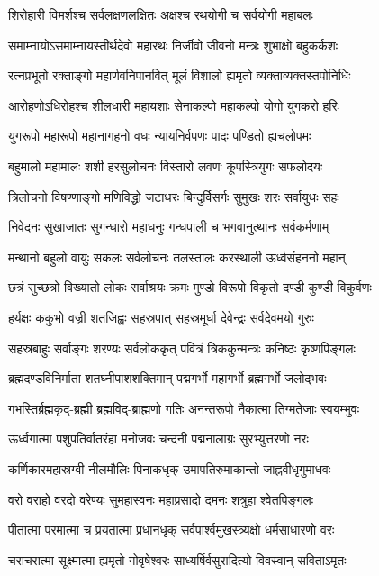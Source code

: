 \twolineshloka
{शिरोहारी विमर्शश्च सर्वलक्षणलक्षितः}%
{अक्षश्च रथयोगी च सर्वयोगी महाबलः}%

\twolineshloka
{समाम्नायोऽसमाम्नायस्तीर्थदेवो महारथः}%
{निर्जीवो जीवनो मन्त्रः शुभाक्षो बहुकर्कशः}%

\twolineshloka
{रत्नप्रभूतो रक्ताङ्गो महार्णवनिपानवित्}%
{मूलं विशालो ह्यमृतो व्यक्ताव्यक्तस्तपोनिधिः}%

\twolineshloka
{आरोहणोऽधिरोहश्च शीलधारी महायशाः}%
{सेनाकल्पो महाकल्पो योगो युगकरो हरिः}%

\twolineshloka
{युगरूपो महारूपो महानागहनो वधः}%
{न्यायनिर्वपणः पादः पण्डितो ह्यचलोपमः}%

\twolineshloka
{बहुमालो महामालः शशी हरसुलोचनः}%
{विस्तारो लवणः कूपस्त्रियुगः सफलोदयः}%

\twolineshloka
{त्रिलोचनो विषण्णाङ्गो मणिविद्धो जटाधरः}%
{बिन्दुर्विसर्गः सुमुखः शरः सर्वायुधः सहः}%

\twolineshloka
{निवेदनः सुखाजातः सुगन्धारो महाधनुः}%
{गन्धपाली च भगवानुत्थानः सर्वकर्मणाम्}%

\twolineshloka
{मन्थानो बहुलो वायुः सकलः सर्वलोचनः}%
{तलस्तालः करस्थाली ऊर्ध्वसंहननो महान्}%

\twolineshloka
{छत्रं सुच्छत्रो विख्यातो लोकः सर्वाश्रयः क्रमः}%
{मुण्डो विरूपो विकृतो दण्डी कुण्डी विकुर्वणः}%

\twolineshloka
{हर्यक्षः ककुभो वज्री शतजिह्वः सहस्रपात्}%
{सहस्रमूर्धा देवेन्द्रः सर्वदेवमयो गुरुः}%

\twolineshloka
{सहस्रबाहुः सर्वाङ्गः शरण्यः सर्वलोककृत्}%
{पवित्रं त्रिककुन्मन्त्रः कनिष्ठः कृष्णपिङ्गलः}%

\twolineshloka
{ब्रह्मदण्डविनिर्माता शतघ्नीपाशशक्तिमान्}%
{पद्मगर्भो महागर्भो ब्रह्मगर्भो जलोद्भवः}%

\twolineshloka
{गभस्तिर्ब्रह्मकृद्-ब्रह्मी ब्रह्मविद्-ब्राह्मणो गतिः}%
{अनन्तरूपो नैकात्मा तिग्मतेजाः स्वयम्भुवः}%

\twolineshloka
{ऊर्ध्वगात्मा पशुपतिर्वातरंहा मनोजवः}%
{चन्दनी पद्मनालाग्रः सुरभ्युत्तरणो नरः}%

\twolineshloka
{कर्णिकारमहास्रग्वी नीलमौलिः पिनाकधृक्}%
{उमापतिरुमाकान्तो जाह्नवीधृगुमाधवः}%

\twolineshloka
{वरो वराहो वरदो वरेण्यः सुमहास्वनः}%
{महाप्रसादो दमनः शत्रुहा श्वेतपिङ्गलः}%

\twolineshloka
{पीतात्मा परमात्मा च प्रयतात्मा प्रधानधृक्}%
{सर्वपार्श्वमुखस्त्र्यक्षो धर्मसाधारणो वरः}%

\twolineshloka
{चराचरात्मा सूक्ष्मात्मा ह्यमृतो गोवृषेश्वरः}%
{साध्यर्षिर्वसुरादित्यो विवस्वान् सविताऽमृतः}%

